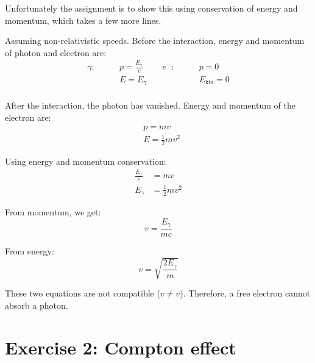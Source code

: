 \documentclass[a4paper,german,12pt,smallheadings]{scrartcl}
\begin{document}
\begin{enumerate}[a)]
    Unfortunately the assignment is to show this using conservation of energy
    and momentum, which takes a few more lines.

    Assuming non-relativistic speeds. Before the interaction, energy and
    momentum of photon and electron are:
    \begin{align*}
      \gamma: \quad \quad & p = \frac{E_\gamma}{c}  &\quad e^-: \quad \quad & p = 0 \\
                          & E = E_\gamma &                & E_\text{kin} = 0 \\
    \end{align*}

    After the interaction, the photon has vanished. Energy and momentum of the
    electron are:
    \begin{align*}
      &p = mv \\
      &E = \frac{1}{2} mv^2
    \end{align*}

    Using energy and momentum conservation:
    \begin{align*}
      \frac{E_\gamma}{c} &= mv\\
      E_\gamma &= \frac{1}{2} mv^2
    \end{align*}

    From momentum, we get:
    \begin{equation*}
      v = \frac{E_\gamma}{mc}
    \end{equation*}

    From energy:
    \begin{equation*}
      v = \sqrt{\frac{2 E_\gamma}{m}}
    \end{equation*}

    These two equations are not compatible ($v \neq v$). Therefore, a free
    electron cannot absorb a photon.



\end{enumerate}

\section*{Exercise 2: Compton effect}
\end{document}
